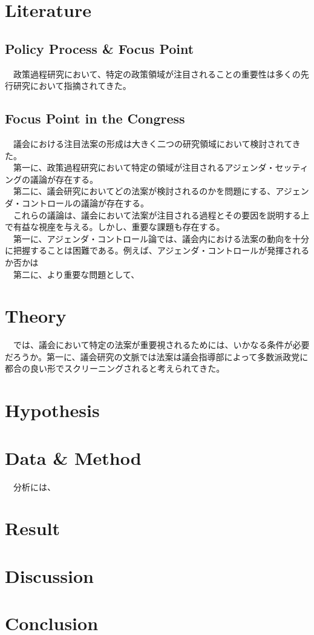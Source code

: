\documentclass{article}
\begin{document}
\section*{Literature}
\subsection*{Policy Process \& Focus Point}
　政策過程研究において、特定の政策領域が注目されることの重要性は多くの先行研究において指摘されてきた。

\subsection*{Focus Point in the Congress}
　議会における注目法案の形成は大きく二つの研究領域において検討されてきた。\\
　第一に、政策過程研究において特定の領域が注目されるアジェンダ・セッティングの議論が存在する。\\
　第二に、議会研究においてどの法案が検討されるのかを問題にする、アジェンダ・コントロールの議論が存在する。\\
　これらの議論は、議会において法案が注目される過程とその要因を説明する上で有益な視座を与える。しかし、重要な課題も存在する。\\
　第一に、アジェンダ・コントロール論では、議会内における法案の動向を十分に把握することは困難である。例えば、アジェンダ・コントロールが発揮されるか否かは\\
　第二に、より重要な問題として、

\section*{Theory}
　では、議会において特定の法案が重要視されるためには、いかなる条件が必要だろうか。第一に、議会研究の文脈では法案は議会指導部によって多数派政党に都合の良い形でスクリーニングされると考えられてきた。
　

\section*{Hypothesis}

\section*{Data \& Method}
　分析には、

\section*{Result}

\section*{Discussion}

\section*{Conclusion}


\end{document}

